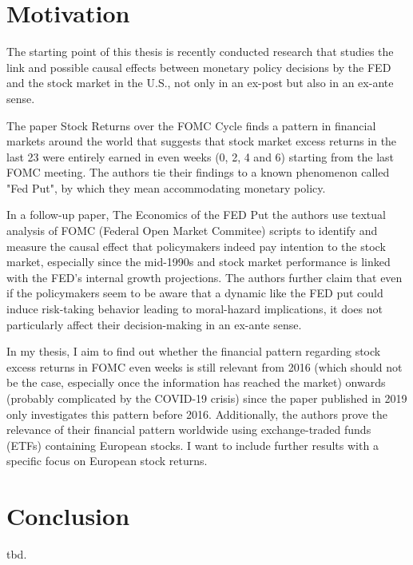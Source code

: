 
\chapter{Motivation}

The starting point of this thesis is recently conducted research that studies the link and possible causal effects between monetary policy decisions by the FED and the stock market in the U.S., not only in an ex-post but also in an ex-ante sense.

The paper Stock Returns over the FOMC Cycle \parencite{cieslak_stock_2019} finds a pattern in financial markets around the world that suggests that stock market excess returns in the last 23 were entirely earned in even weeks (0, 2, 4 and 6) starting from the last FOMC meeting. The authors tie their findings to a known phenomenon called "Fed Put", by which they mean accommodating monetary policy.

In a follow-up paper, The Economics of the FED Put \parencite{cieslak_economics_2021} the authors use textual analysis of FOMC (Federal Open Market Commitee) scripts to identify and measure the causal effect that policymakers indeed pay intention to the stock market, especially since the mid-1990s and stock market performance is linked with the FED’s internal growth projections. The authors further claim that even if the policymakers seem to be aware that a dynamic like the FED put could induce risk-taking behavior leading to moral-hazard implications, it does not particularly affect their decision-making in an ex-ante sense.

In my thesis, I aim to find out whether the financial pattern regarding stock excess returns in FOMC even weeks is still relevant from 2016 (which should not be the case, especially once the information has reached the market) onwards (probably complicated by the COVID-19 crisis) since the paper published in 2019 only investigates this pattern before 2016. Additionally, the authors prove the relevance of their financial pattern worldwide using exchange-traded funds (ETFs) containing European stocks. I want to include further results with a specific focus on European stock returns.






%

\chapter{Conclusion}

tbd.

